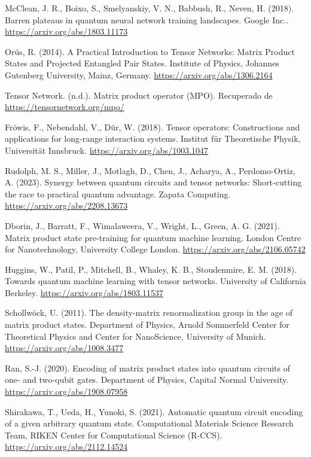 \begin{thebibliography}{a}
McClean, J. R., Boixo, S., Smelyanskiy, V. N., Babbush, R., Neven, H. (2018). Barren plateaus in quantum neural network training landscapes. Google Inc..
\url{https://arxiv.org/abs/1803.11173}

Orús, R. (2014). A Practical Introduction to Tensor Networks: Matrix Product States and Projected Entangled Pair States. Institute of Physics, Johannes Gutenberg University, Mainz, Germany.
\url{https://arxiv.org/abs/1306.2164}

Tensor Network. (n.d.). Matrix product operator (MPO). Recuperado de
\url{https://tensornetwork.org/mpo/}

Fröwis, F., Nebendahl, V., Dür, W. (2018). Tensor operators: Constructions and applications for long-range interaction systems. Institut für Theoretische Physik, Universität Innsbruck.
\url{https://arxiv.org/abs/1003.1047}

Rudolph, M. S., Miller, J., Motlagh, D., Chen, J., Acharya, A., Perdomo-Ortiz, A. (2023). Synergy between quantum circuits and tensor networks: Short-cutting the race to practical quantum advantage. Zapata Computing.
\url{https://arxiv.org/abs/2208.13673}

Dborin, J., Barratt, F., Wimalaweera, V., Wright, L., Green, A. G. (2021). Matrix product state pre-training for quantum machine learning. London Centre for Nanotechnology, University College London.
\url{https://arxiv.org/abs/2106.05742}

Huggins, W., Patil, P., Mitchell, B., Whaley, K. B., Stoudenmire, E. M. (2018). Towards quantum machine learning with tensor networks. University of California Berkeley.
\url{https://arxiv.org/abs/1803.11537}

Schollwöck, U. (2011). The density-matrix renormalization group in the age of matrix product states. Department of Physics, Arnold Sommerfeld Center for Theoretical Physics and Center for NanoScience, University of Munich.
\url{https://arxiv.org/abs/1008.3477}

Ran, S.-J. (2020). Encoding of matrix product states into quantum circuits of one- and two-qubit gates. Department of Physics, Capital Normal University.
\url{https://arxiv.org/abs/1908.07958}

Shirakawa, T., Ueda, H.,  Yunoki, S. (2021). Automatic quantum circuit encoding of a given arbitrary quantum state. Computational Materials Science Research Team, RIKEN Center for Computational Science (R-CCS).
\url{https://arxiv.org/abs/2112.14524}


\end{thebibliography}
